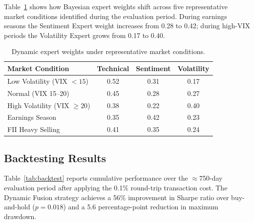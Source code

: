 \documentclass[10pt,a4paper,twoside]{article}
\begin{document}
Table~\ref{tab:fusion_weights} shows how Bayesian expert weights shift across
five representative market conditions identified during the evaluation period.
During earnings seasons the Sentiment Expert weight increases from 0.28 to 0.42;
during high-VIX periods the Volatility Expert grows from 0.17 to 0.40.

\begin{table}[htb]
  \begin{center}
    {\caption{Dynamic expert weights under representative market
    conditions.}\label{tab:fusion_weights}}
    \begin{tabular}{|l|c|c|c|}
    \hline
    \textbf{Market Condition} & \textbf{Technical} & \textbf{Sentiment} & \textbf{Volatility} \\
    \hline
    Low Volatility (VIX $< 15$) & 0.52 & 0.31 & 0.17 \\
    Normal (VIX 15--20) & 0.45 & 0.28 & 0.27 \\
    High Volatility (VIX $\geq 20$) & 0.38 & 0.22 & 0.40 \\
    Earnings Season & 0.35 & 0.42 & 0.23 \\
    FII Heavy Selling & 0.41 & 0.35 & 0.24 \\
    \hline
    \end{tabular}
  \end{center}
\end{table}

\subsection{Backtesting Results}

Table~\ref{tab:backtest} reports cumulative performance over the
$\approx$750-day evaluation period after applying the 0.1\% round-trip
transaction cost. The Dynamic Fusion strategy achieves a 56\% improvement in
Sharpe ratio over buy-and-hold ($p = 0.018$) and a 5.6 percentage-point
reduction in maximum drawdown.
\end{document}
